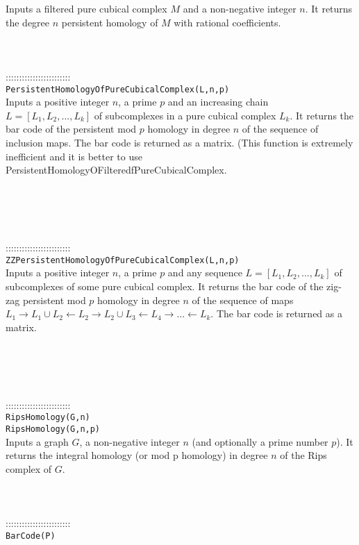 \documentclass[a4paper,11pt]{report}
\begin{document}
{ Inputs a filtered pure cubical complex $M$ and a non-negative integer $n$. It returns the degree $n$ persistent homology of $ M$ with rational coefficients. \\
 \\
 \\
 \\
 ::::::::::::::::::::::::\\
 \texttt{PersistentHomologyOfPureCubicalComplex(L,n,p)}\\
 

 Inputs a positive integer $n$, a prime $p$ and an increasing chain $L=[L_1, L_2, ..., L_k]$ of subcomplexes in a pure cubical complex $L_k$. It returns the bar code of the persistent mod $p$ homology in degree $n$ of the sequence of inclusion maps. The bar code is returned as a matrix. (This
function is extremely inefficient and it is better to use
PersistentHomologyOFilteredfPureCubicalComplex. 

 \\
 \\
 \\
 \\
 ::::::::::::::::::::::::\\
 \texttt{ZZPersistentHomologyOfPureCubicalComplex(L,n,p)}\\
 

 Inputs a positive integer $n$, a prime $p$ and any sequence $L=[L_1, L_2, ..., L_k]$ of subcomplexes of some pure cubical complex. It returns the bar code of the
zig-zag persistent mod $p$ homology in degree $n$ of the sequence of maps $L_1 \rightarrow L_1 \cup L_2 \leftarrow L_2 \rightarrow L_2 \cup L_3
\leftarrow L_4 \rightarrow ... \leftarrow L_k$. The bar code is returned as a matrix. 

 \\
 \\
 \\
 \\
 ::::::::::::::::::::::::\\
 \texttt{RipsHomology(G,n)}\\
 \texttt{RipsHomology(G,n,p)}\\
 

 Inputs a graph $G$, a non-negative integer $n$ (and optionally a prime number $p$). It returns the integral homology (or mod p homology) in degree $n$ of the Rips complex of $G$. \\
 \\
 \\
 \\
 ::::::::::::::::::::::::\\
 \texttt{BarCode(P)}\\
 

}
\end{document}
